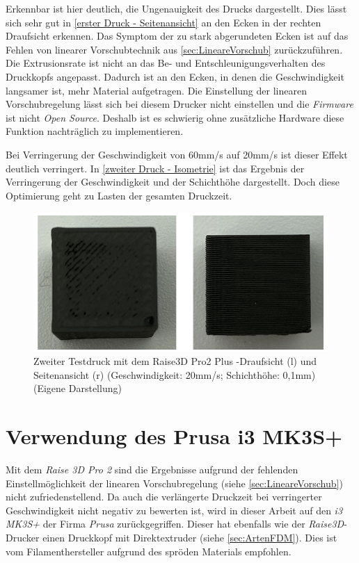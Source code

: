 Erkennbar ist hier deutlich, die Ungenauigkeit des Drucks dargestellt. Dies lässt sich sehr gut in \autoref{erster Druck - Seitenansicht} an den Ecken in der rechten Draufsicht erkennen. Das Symptom der zu stark abgerundeten Ecken ist auf das Fehlen von linearer Vorschubtechnik aus \autoref{sec:LineareVorschub} zurückzuführen. Die Extrusionsrate ist nicht an das Be- und Entschleunigungsverhalten des Druckkopfs angepasst. Dadurch ist an den Ecken, in denen die Geschwindigkeit langsamer ist, mehr Material aufgetragen. Die Einstellung der linearen Vorschubregelung lässt sich bei diesem Drucker nicht einstellen und die \textit{Firmware} ist nicht \textit{Open Source}. Deshalb ist es schwierig ohne zusätzliche Hardware diese Funktion nachträglich zu implementieren.

Bei Verringerung der Geschwindigkeit von 60mm/s auf 20mm/s ist dieser Effekt deutlich verringert. In \autoref{zweiter Druck - Isometrie} ist das Ergebnis der Verringerung der Geschwindigkeit und der Schichthöhe dargestellt. Doch diese Optimierung geht zu Lasten der gesamten Druckzeit. 

\begin{figure}[h]
	\centering
	\includegraphics[width=\linewidth]{bilder/2. Testdruck auf Raise Pro 3D Seitenansicht - Draufsicht.png}
        \caption[Zweiter Testdruck mit dem Raise3D Pro2 Plus - Isometrische Ansicht] {Zweiter Testdruck mit dem Raise3D Pro2 Plus -Draufsicht (l) und Seitenansicht (r) (Geschwindigkeit: 20mm/s; Schichthöhe: 0,1mm) (Eigene Darstellung)}
	\label{zweiter Druck - Isometrie}
\end{figure}

\section{Verwendung des Prusa i3 MK3S+}
\label{Drucker}

Mit dem \textit{Raise 3D Pro 2} sind die Ergebnisse aufgrund der fehlenden Einstellmöglichkeit der linearen Vorschubregelung (siehe \autoref{sec:LineareVorschub}) nicht zufriedenstellend. Da auch die verlängerte Druckzeit bei verringerter Geschwindigkeit nicht negativ zu bewerten ist, wird in dieser Arbeit auf den \textit{i3 MK3S+} der Firma \textit{Prusa} zurückgegriffen. Dieser hat ebenfalls wie der \textit{Raise3D}-Drucker einen Druckkopf mit Direktextruder (siehe \autoref{sec:ArtenFDM}). Dies ist vom Filamenthersteller aufgrund des spröden Materials empfohlen.

